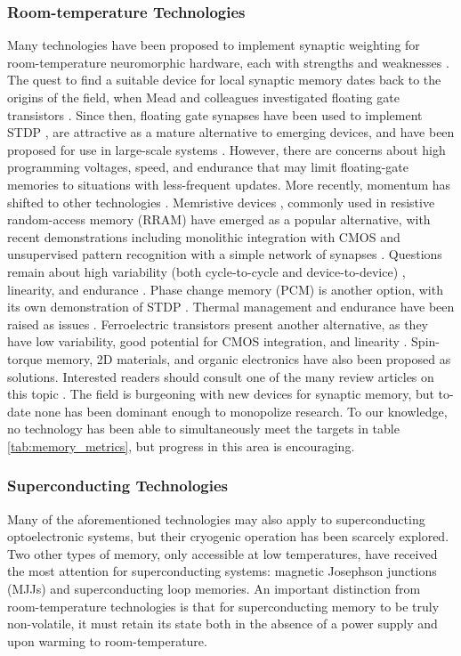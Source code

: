 \documentclass[twocolumn]{article}
\begin{document}
\subsubsection{Room-temperature Technologies}
Many technologies have been proposed to implement synaptic weighting for room-temperature neuromorphic hardware, each with strengths and weaknesses \cite{upadhyay2019emerging}. The quest to find a suitable device for local synaptic memory dates back to the origins of the field, when Mead and colleagues investigated floating gate transistors \cite{diorio1998floating}. Since then, floating gate synapses have been used to implement STDP \cite{ramakrishnan2011floating}, are attractive as a mature alternative to emerging devices, and have been proposed for use in large-scale systems \cite{hasler2013finding}. However, there are concerns about high programming voltages, speed, and endurance that may limit floating-gate memories to situations with less-frequent updates. More recently, momentum has shifted to other technologies \cite{zahoor2020resistive}.  Memristive devices \cite{stsn2008,yast2012,ab2018}, commonly used in resistive random-access memory (RRAM) have emerged as a popular alternative, with recent demonstrations including monolithic integration with CMOS \cite{yin2019monolithically} and unsupervised pattern recognition with a simple network of synapses \cite{ielmini2018brain}. Questions remain about high variability (both cycle-to-cycle and device-to-device) \cite{dalgaty2019hybrid}, linearity, and endurance \cite{zahoor2020resistive}. Phase change memory (PCM) is another option, with its own demonstration of STDP \cite{ambrogio2016unsupervised}. Thermal management and endurance have been raised as issues \cite{upadhyay2019emerging, zahoor2020resistive}. Ferroelectric transistors present another alternative, as they have low variability, good potential for CMOS integration, and linearity \cite{kim2019ferroelectric}.  Spin-torque memory, 2D materials, and organic electronics have also been proposed as solutions. Interested readers should consult one of the many review articles on this topic \cite{kim2018recent, upadhyay2019emerging, zhang2020brain}. The field is burgeoning with new devices for synaptic memory, but to-date none has been dominant enough to monopolize research. To our knowledge, no technology has been able to simultaneously meet the targets in table\,\ref{tab:memory_metrics}, but progress in this area is encouraging.

\subsubsection{Superconducting Technologies}
Many of the aforementioned technologies may also apply to superconducting optoelectronic systems, but their cryogenic operation has been scarcely explored. Two other types of memory, only accessible at low temperatures, have received the most attention for superconducting systems: magnetic Josephson junctions (MJJs) and superconducting loop memories. An important distinction from room-temperature technologies is that for superconducting memory to be truly non-volatile, it must retain its state both in the absence of a power supply and upon warming to room-temperature.
\end{document}
